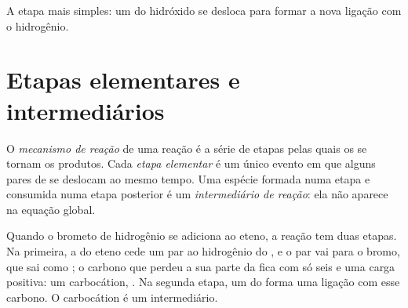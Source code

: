 \begin{omfigure}
\qquad\raisebox{0.2ex}{$+$}\qquad
{}
\qquad\raisebox{0.2ex}{$\longrightarrow$}\qquad
{}

{\small A etapa mais simples: um  do  hidróxido se
desloca para formar a nova ligação  com o  hidrogênio.}
\end{omfigure}

\section{Etapas elementares e intermediários}

\begin{definition}\label{def:g12:curly-arrows:mechanism}
O \emph{mecanismo de reação} de uma reação é
a série de etapas pelas quais os  se tornam os produtos. Cada
\emph{etapa elementar} é um único evento em que
alguns pares de  se deslocam ao mesmo tempo. Uma espécie formada
numa etapa e consumida numa etapa posterior é um \emph{intermediário de
reação}: ela não aparece na equação
global.
\end{definition}


\begin{example}\label{ex:g12:curly-arrows:carbocation}
Quando o brometo de hidrogênio se adiciona ao eteno, a reação tem duas
etapas. Na primeira, a  do eteno cede um par ao hidrogênio
do , e o par  vai para o bromo, que sai como ;
o carbono que perdeu a sua parte da  fica com só seis
 e uma carga positiva: um carbocátion, . Na segunda
etapa, um  do  forma uma ligação com esse
carbono. O carbocátion é um intermediário.
\end{example}

